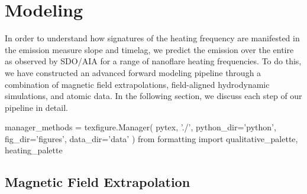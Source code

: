 \section{Modeling}\label{modeling}

In order to understand how signatures of the heating frequency are manifested in the emission measure slope and timelag, we predict the emission over the entire \AR{} as observed by SDO/AIA for a range of nanoflare heating frequencies. To do this, we have constructed an advanced forward modeling pipeline through a combination of magnetic field extrapolations, field-aligned hydrodynamic simulations, and atomic data. In the following section, we discuss each step of our pipeline in detail.

\begin{pycode}
manager_methods = texfigure.Manager(
    pytex, './',
    python_dir='python',
    fig_dir='figures',
    data_dir='data'
)
from formatting import qualitative_palette, heating_palette
\end{pycode}

\subsection{Magnetic Field Extrapolation}\label{field}

